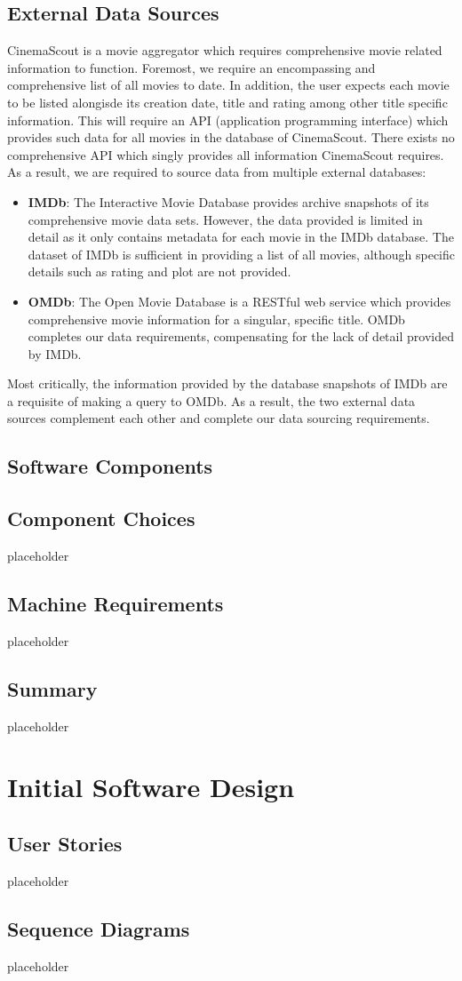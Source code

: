 \documentclass{article}
\begin{document}
\subsection{External Data Sources}
CinemaScout is a movie aggregator which requires comprehensive movie 
related information to function.
Foremost, we require an encompassing and comprehensive list of all
movies to date. In addition, the user expects each movie to be listed alongisde 
its creation date, title and rating among other title specific information. 
This will require an API (application programming interface) which provides 
such data for all movies in the database of CinemaScout.\newline \newline
There exists no comprehensive API which singly provides all information 
CinemaScout requires. As a result, we are required to source data from multiple
external databases:
\begin{itemize}
\item \textbf{IMDb}: The Interactive Movie Database provides archive
snapshots of its comprehensive movie data sets. However, the data provided
is limited in detail as it only contains metadata for each movie in the IMDb
database. The dataset of IMDb is sufficient in providing a list of all movies,
although specific details such as rating and plot are not provided.
\item \textbf{OMDb}: The Open Movie Database is a RESTful web service
which provides comprehensive movie information for a singular, specific title. 
OMDb completes our data requirements, compensating for the lack of detail
provided by IMDb.
\end{itemize}
Most critically, the information provided by the database snapshots of IMDb
are a requisite of making a query to OMDb. As a result, the two external data
sources complement each other and complete our data sourcing requirements.
\subsection{Software Components}
\subsection{Component Choices}
placeholder
\subsection{Machine Requirements}
placeholder
\subsection{Summary}
placeholder
\section{Initial Software Design}
\subsection{User Stories}
placeholder
\subsection{Sequence Diagrams}
placeholder
\end{document}
